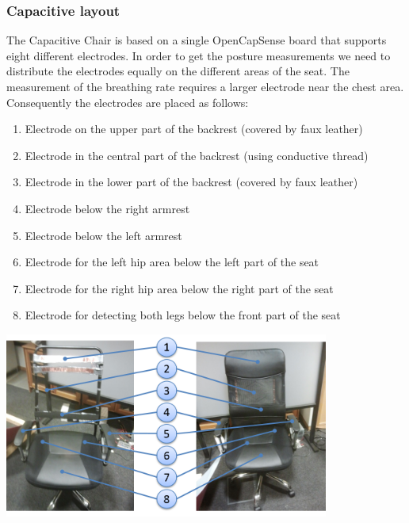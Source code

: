\subsubsection{Capacitive layout}
The Capacitive Chair is based on a single OpenCapSense board that supports eight different electrodes. In order to get the posture measurements we need to distribute the electrodes equally on the different areas of the seat. The measurement of the breathing rate requires a larger electrode near the chest area. Consequently the electrodes are placed as follows:
\begin{enumerate}
\item Electrode on the upper part of the backrest (covered by faux leather)
\item Electrode in the central part of the backrest (using conductive thread)
\item Electrode in the lower part of the backrest (covered by faux leather)
\item Electrode below the right armrest
\item Electrode below the left armrest
\item Electrode for the left hip area below the left part of the seat
\item Electrode for the right hip area below the right part of the seat
\item Electrode for detecting both legs below the front part of the seat
\end{enumerate}

\begin{minipage}{\linewidth}
\centering
\includegraphics[width=0.8\textwidth]{images/prot_capchair_electrode_layout}
\label{fig:prot_capchair_electrode_layout}
\end{minipage}

